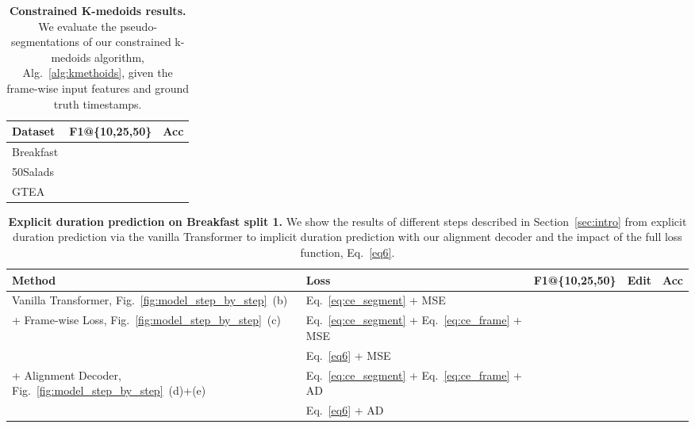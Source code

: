 \begin{table}[h]
\centering
\caption{\textbf{Constrained K-medoids results.} We evaluate the pseudo-segmentations of our constrained k-medoids algorithm, Alg.~\ref{alg:kmethoids}, given the frame-wise input features and ground truth timestamps.}
\label{table:kmethoids}
\resizebox{1.6 in}{!} {
\begin{tabular}{l|ccc|c}
\hline 
\hline 
Dataset & \multicolumn{3}{c|}{F1@\{10,25,50\}} & Acc \\
\hline 
Breakfast &  &  &  & \\
50Salads &  &  &  & \\
GTEA &  &  &  & \\
\hline 
\hline 
\end{tabular}
}
\end{table}

\begin{table}[h]
\centering
\caption{\textbf{Explicit duration prediction on Breakfast split 1.}
We show the results of different steps described in Section~\ref{sec:intro} from explicit duration prediction via the vanilla Transformer to implicit duration prediction with our alignment decoder and the impact of the full loss function, Eq.~\eqref{eq6}.}
\label{tab:expl_dur}
\resizebox{4.0 in}{!} {
\begin{tabular}{ll|ccc|c|c}
\hline 
\hline 
Method & Loss & \multicolumn{3}{c|}{F1@\{10,25,50\}} & Edit & Acc \\
\hline 
Vanilla Transformer, Fig.~\ref{fig:model_step_by_step}~(b) & Eq.~\eqref{eq:ce_segment} + MSE &  &  &  &  &  \\
\hline
\multirow{2}{*}{+ Frame-wise Loss, Fig.~\ref{fig:model_step_by_step}~(c) } & Eq.~\eqref{eq:ce_segment} + Eq.~\eqref{eq:ce_frame} + MSE 
&  &  &  &  &  \\
& Eq.~\eqref{eq6} + MSE &  &  &  &  &  \\
\hline
\multirow{2}{*}{+ Alignment Decoder, Fig.~\ref{fig:model_step_by_step}~(d)+(e)} & Eq.~\eqref{eq:ce_segment} + Eq.~\eqref{eq:ce_frame} + AD &  &  &  &  &  \\
& Eq.~\eqref{eq6} + AD &  &  &  &  &  \\
\hline 
\hline 
\end{tabular}
}
\end{table}



